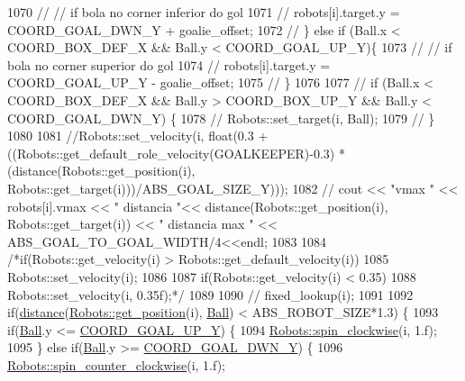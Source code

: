 \begin{DoxyCode}
1070             \textcolor{comment}{//  // if bola no corner inferior do gol}
1071             \textcolor{comment}{//  robots[i].target.y = COORD\_GOAL\_DWN\_Y + goalie\_offset;}
1072             \textcolor{comment}{// \} else if (Ball.x < COORD\_BOX\_DEF\_X && Ball.y < COORD\_GOAL\_UP\_Y)\{}
1073             \textcolor{comment}{//  // if bola no corner superior do gol}
1074             \textcolor{comment}{//  robots[i].target.y = COORD\_GOAL\_UP\_Y - goalie\_offset;}
1075             \textcolor{comment}{// \}}
1076 
1077             \textcolor{comment}{// if (Ball.x < COORD\_BOX\_DEF\_X && Ball.y > COORD\_BOX\_UP\_Y && Ball.y < COORD\_GOAL\_DWN\_Y) \{}
1078             \textcolor{comment}{//  Robots::set\_target(i, Ball);}
1079             \textcolor{comment}{// \}}
1080 
1081             \textcolor{comment}{//Robots::set\_velocity(i, float(0.3 + ((Robots::get\_default\_role\_velocity(GOALKEEPER)-0.3) *
       (distance(Robots::get\_position(i), Robots::get\_target(i)))/ABS\_GOAL\_SIZE\_Y)));}
1082             \textcolor{comment}{// cout << "vmax " << robots[i].vmax << " distancia "<< distance(Robots::get\_position(i),
       Robots::get\_target(i)) << " distancia max " << ABS\_GOAL\_TO\_GOAL\_WIDTH/4<<endl;}
1083 
1084             \textcolor{comment}{/*if(Robots::get\_velocity(i) > Robots::get\_default\_velocity(i))}
1085 \textcolor{comment}{                Robots::set\_velocity(i);}
1086 \textcolor{comment}{}
1087 \textcolor{comment}{            if(Robots::get\_velocity(i) < 0.35)}
1088 \textcolor{comment}{                Robots::set\_velocity(i, 0.35f);*/}
1089 
1090             \textcolor{comment}{// fixed\_lookup(i);}
1091 
1092             \textcolor{keywordflow}{if}(\hyperlink{class_strategy_aacce05caed71553c4efd2d28c9c3aa39}{distance}(\hyperlink{class_robots_a1fca8f2f5070176faa6ba1efa2f1ff14}{Robots::get\_position}(i), 
      \hyperlink{class_strategy_abd16b6276e747f6cd99a19963ff5495b}{Ball}) < ABS\_ROBOT\_SIZE*1.3) \{
1093                 \textcolor{keywordflow}{if}(\hyperlink{class_strategy_abd16b6276e747f6cd99a19963ff5495b}{Ball}.y <= \hyperlink{namespace_c_o_n_s_t_ab1e77f62ff88d04c9aac407f4405add2}{COORD\_GOAL\_UP\_Y}) \{
1094                     \hyperlink{class_robots_a6bd2e21654da3f7c3acc380a2b838240}{Robots::spin\_clockwise}(i, 1.f);
1095                 \} \textcolor{keywordflow}{else} \textcolor{keywordflow}{if}(\hyperlink{class_strategy_abd16b6276e747f6cd99a19963ff5495b}{Ball}.y >= \hyperlink{namespace_c_o_n_s_t_a97382a534273f1ca10b7cdf29fab9d0a}{COORD\_GOAL\_DWN\_Y}) \{
1096                     \hyperlink{class_robots_a54c13103d74e172273acf2e56ba5e8fb}{Robots::spin\_counter\_clockwise}(i, 1.f);

\end{DoxyCode}
